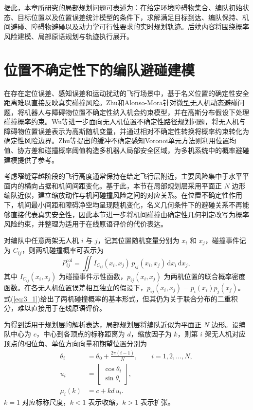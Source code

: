 据此，本章所研究的局部规划问题可表述为：在给定环境障碍物集合、编队初始状态、目标位置以及位置误差统计模型的条件下，求解满足目标到达、编队保持、机间避碰、障碍物避碰以及动力学可行性要求的实时规划轨迹。后续内容将围绕概率风险建模、局部原语规划与轨迹执行展开。

\section{位置不确定性下的编队避碰建模}

在存在定位误差、感知误差和运动扰动的飞行场景中，基于名义位置的确定性安全距离难以直接反映真实碰撞风险。Zhu和Alonso-Mora针对微型无人机动态避碰问题，将机器人与障碍物位置不确定性纳入机会约束模型，并在高斯分布假设下处理碰撞概率约束\cite{zhu2019chanceMAV}。Wu等进一步面向无人机位置不确定性路径规划问题，将无人机与障碍物位置误差表示为高斯随机变量，并通过相对不确定性转换将概率约束转化为确定性风险边界\cite{wu2020safeUAVLocation}。Zhu等提出的缓冲不确定感知Voronoi单元方法则利用位置均值、协方差和碰撞概率阈值构造多机器人局部安全区域，为多机系统中的概率避碰建模提供了参考\cite{zhu2022buavc}。

考虑窄缝穿越阶段的飞行高度通常保持在给定飞行层附近，主要风险集中于水平平面内的横向占据和机间间距变化。基于此，本节在局部规划层采用平面正 $N$ 边形编队近似，建立缩放动作与机间碰撞风险之间的对应关系。在位置不确定性作用下，机间最小间距和障碍净空均呈现随机变化，名义几何条件下的避碰关系不再能够直接代表真实安全性，因此本节进一步将机间碰撞由确定性几何判定改写为概率风险约束，并整理为适用于在线原语评价的代价表达。

对编队中任意两架无人机 $i$ 与 $j$，记其位置随机变量分别为 $x_{i}$ 和 $x_{j}$，碰撞事件记为 $C_{ij}$，则两机碰撞概率可表示为
\begin{equation}
P_{ij}^{\mathrm{col}} = \iint I_{C_{ij}}(x_{i}, x_{j}) \, p_{ij}(x_{i}, x_{j}) \, \mathrm{d}x_{i} \, \mathrm{d}x_{j},
\label{eq:3_1}
\end{equation}
其中 $I_{C_{ij}}(x_{i}, x_{j})$ 为碰撞事件示性函数，$p_{ij}(x_{i}, x_{j})$ 为两机位置的联合概率密度函数。在各无人机位置误差相互独立的假设下，$p_{ij}(x_{i}, x_{j}) = p_{i}(x_{i}) p_{j}(x_{j})$。式(\ref{eq:3_1})给出了两机碰撞概率的基本形式，但其仍为关于联合分布的二重积分，难以直接用于在线原语评价。

为得到适用于规划层的解析表达，局部规划层将编队近似为平面正 $N$ 边形。设编队中心为 $c$，中心到各顶点的标称距离为 $d$，缩放因子为 $k$，则第 $i$ 架无人机对应顶点的相位角、单位方向向量和期望位置分别为
\[
\begin{aligned}
\theta_{i} &= \theta_{0} + \frac{2\pi (i-1)}{N}, \qquad i=1,2,\ldots,N,\\
u_{i} &=
\begin{bmatrix}
\cos \theta_{i}\\
\sin \theta_{i}
\end{bmatrix},\\
\mu_{i}(k) &= c + k d \, u_{i}.
\end{aligned}
\]
$k=1$ 对应标称尺度，$k<1$ 表示收缩，$k>1$ 表示扩张。

